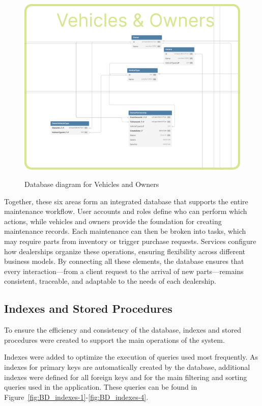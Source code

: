 \begin{figure}[h]
  \caption{Database diagram for Vehicles and Owners}
  \centering
  \includegraphics[width=\textwidth]{figs/dbDiagrams/Vehicles_and_Owners}
  \label{fig:dbVehicles}
\end{figure}


Together, these six areas form an integrated database that supports the entire maintenance workflow. User accounts and roles define who can perform which actions, while vehicles and owners provide the foundation for creating maintenance records. Each maintenance can then be broken into tasks, which may require parts from inventory or trigger purchase requests. Services configure how dealerships organize these operations, ensuring flexibility across different business models. By connecting all these elements, the database ensures that every interaction—from a client request to the arrival of new parts—remains consistent, traceable, and adaptable to the needs of each dealership.

\subsection{Indexes and Stored Procedures}

To ensure the efficiency and consistency of the database, indexes and stored procedures were created to support the main operations of the system.

Indexes were added to optimize the execution of queries used most frequently. As indexes for primary keys are automatically created by the database, additional indexes were defined for all foreign keys and for the main filtering and sorting queries used in the application. These queries can be found in Figure~\ref{fig:BD_indexes-1}-\ref{fig:BD_indexes-4}.  

